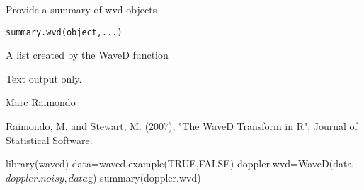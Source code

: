 \begin{Description}\relax
Provide a summary of wvd objects
\end{Description}
\begin{Usage}
\begin{verbatim}
summary.wvd(object,...)
\end{verbatim}
\end{Usage}
\begin{Arguments}
\begin{ldescription}
\item[\code{object}] A list created by the WaveD function  
\end{ldescription}
\end{Arguments}
\begin{Value}
Text output only.
\end{Value}
\begin{Author}\relax
Marc Raimondo
\end{Author}
\begin{References}\relax
Raimondo, M. and Stewart, M. (2007),
"The WaveD Transform in R", Journal of Statistical Software.
\end{References}
\begin{SeeAlso}\relax
{}
\end{SeeAlso}
\begin{Examples}
\begin{ExampleCode}
library(waved)
data=waved.example(TRUE,FALSE)
doppler.wvd=WaveD(data$doppler.noisy,data$g)
summary(doppler.wvd)
\end{ExampleCode}
\end{Examples}

